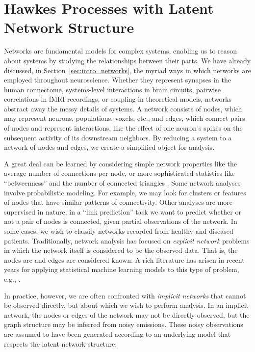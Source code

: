
\chapter{Hawkes Processes with Latent Network Structure}
\label{chap:hawkes}

Networks are fundamental models for complex systems, enabling us to
reason about systems by studying the relationships between their
parts. We have already discussed, in Section~\ref{sec:intro_networks},
the myriad ways in which networks are employed throughout
neuroscience.  Whether they represent synapses in the human
connectome, systems-level interactions in brain circuits, pairwise
correlations in fMRI recordings, or coupling in theoretical models,
networks abstract away the messy details of systems.  A network consists of nodes, which
may represent neurons, populations, voxels, etc., and edges, 
which connect pairs of nodes and represent interactions, like the effect
of one neuron's spikes on the subsequent activity of its downstream
neighbors.  By reducing a system to a network of nodes and edges,
we create a simplified object for analysis.

A great deal can be learned by considering simple network properties
like the average number of connections per node, or more sophisticated
statistics like ``betweenness'' and the number of connected triangles
\cite{bullmore2009complex}.  Some network analyses involve
probabilistic modeling.  For example, we may look for clusters or
features of nodes that have similar patterns of connectivity.  Other
analyses are more supervised in nature; in a ``link
prediction'' task we want to predict whether or not a pair of nodes is
connected, given partial observations of the network. In some cases,
 we wish to classify networks recorded from healthy and diseased patients. 
 Traditionally, network analysis has focused on \emph{explicit network} problems in
which the network itself is considered to be the observed data.  That
is, the nodes are and edges are considered known. A rich literature has arisen in recent
years for applying statistical machine learning models to this type of
problem, e.g., \citet{Liben-2007,Hoff-2008,Goldenberg-2010}.

In practice, however, we are often confronted with \emph{implicit
  networks} that cannot be observed directly, but about which we wish
to perform analysis.  In an implicit network, the nodes or edges of
the network may not be directly observed, but the graph structure may
be inferred from noisy emissions.  These noisy observations are
assumed to have been generated according to an underlying model that
respects the latent network structure.

